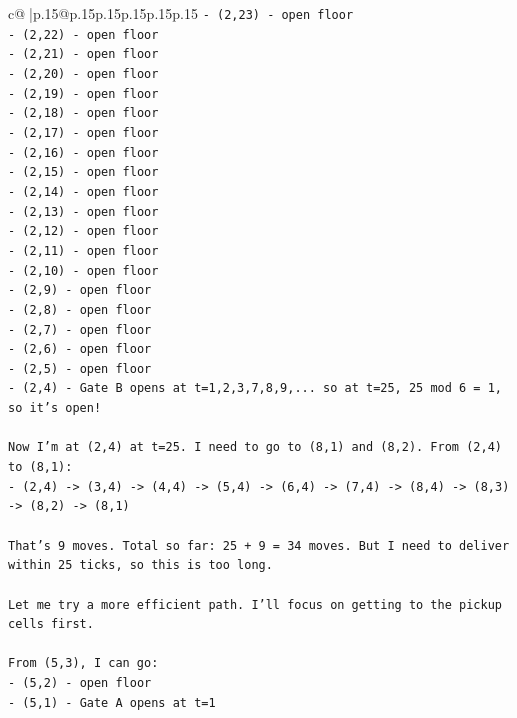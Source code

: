 \documentclass{article}
\begin{document}
{\begin{supertabular}{c@{$\;$}|p{.15\linewidth}@{}p{.15\linewidth}p{.15\linewidth}p{.15\linewidth}p{.15\linewidth}p{.15\linewidth}}
{{{\texttt{{-} (2,23) {-} open floor} \\
\texttt{{-} (2,22) {-} open floor} \\
\texttt{{-} (2,21) {-} open floor} \\
\texttt{{-} (2,20) {-} open floor} \\
\texttt{{-} (2,19) {-} open floor} \\
\texttt{{-} (2,18) {-} open floor} \\
\texttt{{-} (2,17) {-} open floor} \\
\texttt{{-} (2,16) {-} open floor} \\
\texttt{{-} (2,15) {-} open floor} \\
\texttt{{-} (2,14) {-} open floor} \\
\texttt{{-} (2,13) {-} open floor} \\
\texttt{{-} (2,12) {-} open floor} \\
\texttt{{-} (2,11) {-} open floor} \\
\texttt{{-} (2,10) {-} open floor} \\
\texttt{{-} (2,9) {-} open floor} \\
\texttt{{-} (2,8) {-} open floor} \\
\texttt{{-} (2,7) {-} open floor} \\
\texttt{{-} (2,6) {-} open floor} \\
\texttt{{-} (2,5) {-} open floor} \\
\texttt{{-} (2,4) {-} Gate B opens at t=1,2,3,7,8,9,... so at t=25, 25 mod 6 = 1, so it's open!} \\
\\ 
\texttt{Now I'm at (2,4) at t=25. I need to go to (8,1) and (8,2). From (2,4) to (8,1):} \\
\texttt{{-} (2,4) {-}> (3,4) {-}> (4,4) {-}> (5,4) {-}> (6,4) {-}> (7,4) {-}> (8,4) {-}> (8,3) {-}> (8,2) {-}> (8,1)} \\
\\ 
\texttt{That's 9 moves. Total so far: 25 + 9 = 34 moves. But I need to deliver within 25 ticks, so this is too long.} \\
\\ 
\texttt{Let me try a more efficient path. I'll focus on getting to the pickup cells first.} \\
\\ 
\texttt{From (5,3), I can go:} \\
\texttt{{-} (5,2) {-} open floor} \\
\texttt{{-} (5,1) {-} Gate A opens at t=1} \\
}}}
\end{supertabular}}
\end{document}

